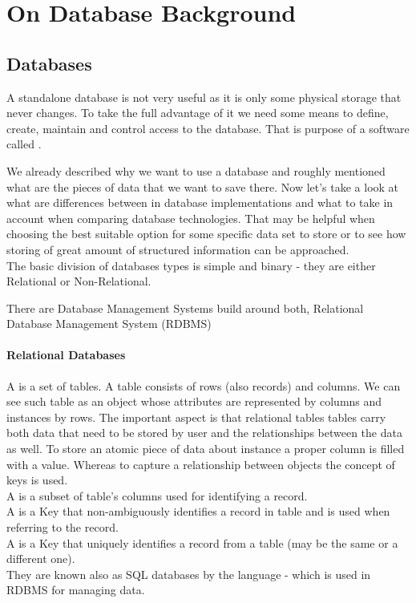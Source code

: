 \chapter{On Database Background}

\section{Databases}

A standalone database is not very useful as it is only some physical storage that never changes. To take the full advantage of it we need some means to define, create, maintain and control access to the database. That is purpose of a software called .

We already described why we want to use a database and roughly mentioned what are the pieces of data that we want to save there. 
Now let's take a look at what are differences between in database implementations and what to take in account when comparing database technologies.
That may be helpful when choosing the best suitable option for some specific data set to store or to see how storing of great amount of structured information can be approached. \\ 

The basic division of databases types is simple and binary - they are either Relational or Non-Relational.

There are Database Management Systems build around both, Relational Database Management System (RDBMS)

\subsubsection{Relational Databases}
A  is a set of tables. A table consists of rows (also records) and columns. We can see such table as an object whose attributes are represented by columns and instances by rows. 
The important aspect is that relational tables tables carry both data that need to be stored by user and the relationships between the data as well. 
To store an atomic piece of data about instance a proper column is filled with a value.
Whereas to capture a relationship between objects the concept of keys is used. \\
A  is a subset of table's columns used for identifying a record. \\
A  is a Key that non-ambiguously identifies a record in table and is used when referring to the record. \\
A  is a Key that uniquely identifies a record from a table (may be the same or a different one). \\
They are known also as SQL databases by the language -  which is used in RDBMS for managing data.

